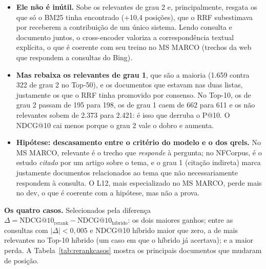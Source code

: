 \documentclass[10pt,a4paper]{article}
\begin{document}
\begin{itemize}
\item \textbf{Ele não é inútil.} Sobe os relevantes de grau 2 e, principalmente, resgata os que só o BM25 tinha encontrado (+10,4 posições), que o RRF subestimava por receberem a contribuição de um único sistema. Lendo consulta e documento juntos, o cross-encoder valoriza a correspondência textual explícita, o que é coerente com seu treino no MS MARCO (trechos da web que respondem a consultas do Bing).
\item \textbf{Mas rebaixa os relevantes de grau 1}, que são a maioria (1.659 contra 322 de grau 2 no Top-50), e os documentos que estavam nas duas listas, justamente os que o RRF tinha promovido por consenso. No Top-10, os de grau 2 passam de 195 para 198, os de grau 1 caem de 662 para 611 e os não relevantes sobem de 2.373 para 2.421: é isso que derruba o P@10. O NDCG@10 cai menos porque o grau 2 vale o dobro e aumenta.
\item \textbf{Hipótese: descasamento entre o critério do modelo e o dos qrels.} No MS MARCO, relevante é o trecho que \emph{responde} à pergunta; no NFCorpus, é o estudo \emph{citado} por um artigo sobre o tema, e o grau 1 (citação indireta) marca justamente documentos relacionados ao tema que não necessariamente respondem à consulta. O L12, mais especializado no MS MARCO, perde mais no dev, o que é coerente com a hipótese, mas não a prova.
\end{itemize}

\textbf{Os quatro casos.} Selecionados pela diferença $\Delta = \mathrm{NDCG@10}_{\text{rerank}} - \mathrm{NDCG@10}_{\text{híbrido}}$: os dois maiores ganhos; entre as consultas com $|\Delta| < 0{,}005$ e NDCG@10 híbrido maior que zero, a de mais relevantes no Top-10 híbrido (um caso em que o híbrido já acertava); e a maior perda. A Tabela~\ref{tab:rerankcasos} mostra os principais documentos que mudaram de posição.
\end{document}
